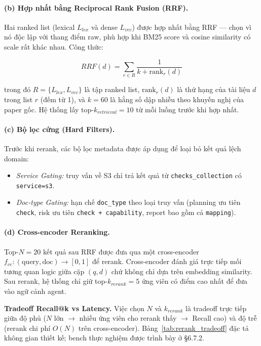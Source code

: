 \paragraph*{(b) Hợp nhất bằng Reciprocal Rank Fusion (RRF).}
Hai ranked list (lexical $L_{lex}$ và dense $L_{vec}$) được hợp nhất bằng RRF \cite{cormack2009rrf} — chọn vì nó độc lập với thang điểm raw, phù hợp khi BM25 score và cosine similarity có scale rất khác nhau. Công thức:

\begin{equation}
  RRF(d) = \sum_{r \in R} \frac{1}{k + \text{rank}_r(d)}
  \label{eq:rrf}
\end{equation}

trong đó $R = \{L_{lex}, L_{vec}\}$ là tập ranked list, $\text{rank}_r(d)$ là thứ hạng của tài liệu $d$ trong list $r$ (đếm từ 1), và $k=60$ là hằng số dập nhiễu theo khuyến nghị của paper gốc. Hệ thống lấy top-$k_{retrieval}=10$ từ mỗi luồng trước khi hợp nhất.

\paragraph*{(c) Bộ lọc cứng (Hard Filters).}
Trước khi rerank, các bộ lọc metadata được áp dụng để loại bỏ kết quả lệch domain:
\begin{itemize}
  \item \textit{Service Gating:} truy vấn về S3 chỉ trả kết quả từ \texttt{checks\_collection} có \texttt{service=s3}.
  \item \textit{Doc-type Gating:} hạn chế \texttt{doc\_type} theo loại truy vấn (planning ưu tiên \texttt{check}, risk ưu tiên \texttt{check + capability}, report bao gồm cả \texttt{mapping}).
\end{itemize}

\paragraph*{(d) Cross-encoder Reranking.}
Top-$N=20$ kết quả sau RRF được đưa qua một cross-encoder $f_{ce}: (\text{query}, \text{doc}) \to [0,1]$ để rerank. Cross-encoder đánh giá trực tiếp mối tương quan logic giữa cặp $(q, d)$ chứ không chỉ dựa trên embedding similarity. Sau rerank, hệ thống chỉ giữ top-$k_{rerank}=5$ ứng viên có điểm cao nhất để đưa vào ngữ cảnh agent.

\textbf{Tradeoff Recall@k vs Latency.} Việc chọn $N$ và $k_{rerank}$ là tradeoff trực tiếp giữa độ phủ ($N$ lớn $\rightarrow$ nhiều ứng viên cho rerank thấy $\rightarrow$ Recall cao) và độ trễ (rerank chi phí $O(N)$ trên cross-encoder). Bảng~\ref{tab:rerank_tradeoff} đặc tả không gian thiết kế; bench thực nghiệm được trình bày ở \S6.7.2.

